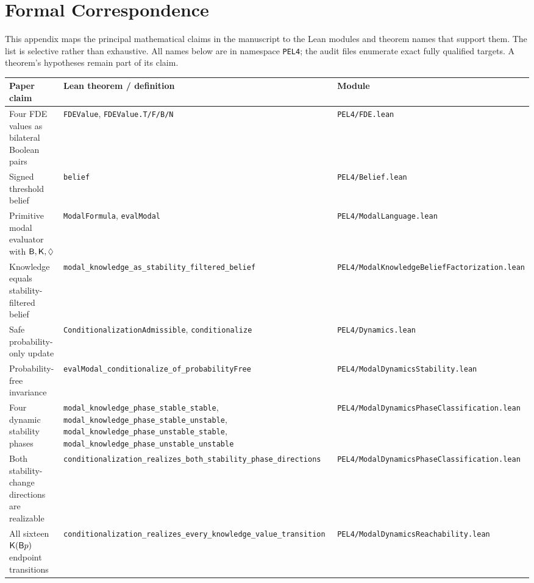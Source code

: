 \section{Formal Correspondence}
\label{app:formal}

This appendix maps the principal mathematical claims in the manuscript to the Lean modules and theorem names that support them. The list is selective rather than exhaustive. All names below are in namespace \texttt{PEL4}; the audit files enumerate exact fully qualified targets. A theorem's hypotheses remain part of its claim.

\begingroup
\small
\begin{longtable}{@{}p{}p{}p{}@{}}
\toprule
Paper claim & Lean theorem / definition & Module\\
\midrule
Four FDE values as bilateral Boolean pairs & \texttt{FDEValue}, \texttt{FDEValue.T/F/B/N} & \texttt{PEL4/FDE.lean}\\
\addlinespace
Signed threshold belief & \texttt{belief} & \texttt{PEL4/Belief.lean}\\
\addlinespace
Primitive modal evaluator with \(\mathsf{B},\mathsf{K},\Diamond\) & \texttt{ModalFormula}, \texttt{evalModal} & \texttt{PEL4/ModalLanguage.lean}\\
\addlinespace
Knowledge equals stability-filtered belief & \texttt{modal\_knowledge\_as\_stability\_filtered\_belief} & \texttt{PEL4/ModalKnowledgeBeliefFactorization.lean}\\
\addlinespace
Safe probability-only update & \texttt{ConditionalizationAdmissible}, \texttt{conditionalize} & \texttt{PEL4/Dynamics.lean}\\
\addlinespace
Probability-free invariance & \texttt{evalModal\_conditionalize\_of\_probabilityFree} & \texttt{PEL4/ModalDynamicsStability.lean}\\
\addlinespace
Four dynamic stability phases & \texttt{modal\_knowledge\_phase\_stable\_stable}, \texttt{modal\_knowledge\_phase\_stable\_unstable}, \texttt{modal\_knowledge\_phase\_unstable\_stable}, \texttt{modal\_knowledge\_phase\_unstable\_unstable} & \texttt{PEL4/ModalDynamicsPhaseClassification.lean}\\
\addlinespace
Both stability-change directions are realizable & \texttt{conditionalization\_realizes\_both\_stability\_phase\_directions} & \texttt{PEL4/ModalDynamicsPhaseClassification.lean}\\
\addlinespace
All sixteen \(\mathsf{K}(\mathsf{B} p)\) endpoint transitions & \texttt{conditionalization\_realizes\_every\_knowledge\_value\_transition} & \texttt{PEL4/ModalDynamicsReachability.lean}\\

\end{longtable}
